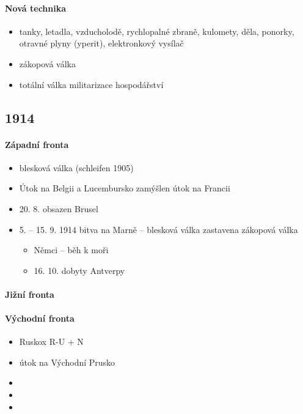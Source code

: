 \paragraph{Nová technika}
\begin{itemize}
\item tanky, letadla, vzducholodě, rychlopalné zbraně, kulomety, děla, ponorky, otravné plyny (yperit), elektronkový vysílač
\item zákopová válka
\item totální válka \ra militarizace hospodářství
\end{itemize}


\subsection{1914}
\paragraph{Západní fronta}
\begin{itemize}
\item blesková válka (schleifen 1905)
\item Útok na Belgii a Lucembursko \ra zamýšlen útok na Francii
\item 20. 8. obsazen Brusel
\item 5. -- 15. 9. 1914 bitva na Marně -- blesková válka zastavena \ra zákopová válka
	\begin{itemize}
	\item Němci -- běh k moři
	\item 16. 10. dobyty Antverpy
	\end{itemize}
\end{itemize}

\paragraph{Jižní fronta}

\paragraph{Východní fronta}
\begin{itemize}
\item Ruskox R-U + N
\item útok na Východní Prusko
\item 
\item 
\item 
\end{itemize}

